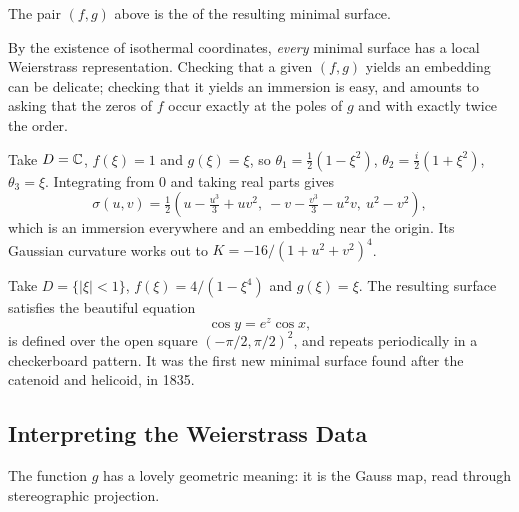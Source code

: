 \documentclass[a4paper]{scrartcl}
\begin{document}
\begin{definition}
    The pair $(f,g)$ above is the  of the resulting minimal surface.
\end{definition}

By the existence of isothermal coordinates, \emph{every} minimal surface has a local Weierstrass representation. Checking that a given $(f,g)$ yields an embedding can be delicate; checking that it yields an immersion is easy, and amounts to asking that the zeros of $f$ occur exactly at the poles of $g$ and with exactly twice the order.

\begin{example}
    Take $D = \mathbb{C}$, $f(\xi) = 1$ and $g(\xi) = \xi$, so $\theta_1 = \tfrac12(1-\xi^2)$, $\theta_2 = \tfrac i2(1+\xi^2)$, $\theta_3 = \xi$. Integrating from $0$ and taking real parts gives
    $$
    \sigma(u,v) = \tfrac12\left(u - \tfrac{u^3}{3} + uv^2,\ -v - \tfrac{v^3}{3} - u^2 v,\ u^2-v^2\right),
    $$
    which is an immersion everywhere and an embedding near the origin. Its Gaussian curvature works out to $K = -16/(1+u^2+v^2)^4$.
\end{example}

\begin{example}
    Take $D = \{|\xi| < 1\}$, $f(\xi) = 4/(1-\xi^4)$ and $g(\xi) = \xi$. The resulting surface satisfies the beautiful equation
    $$
    \cos y = e^z\cos x,
    $$
    is defined over the open square $(-\pi/2,\pi/2)^2$, and repeats periodically in a checkerboard pattern. It was the first new minimal surface found after the catenoid and helicoid, in 1835.
\end{example}

\subsection{Interpreting the Weierstrass Data}

The function $g$ has a lovely geometric meaning: it is the Gauss map, read through stereographic projection.
\end{document}

